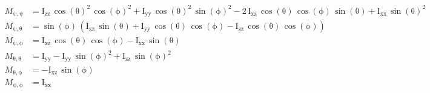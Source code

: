 \begin{align*}
  M_{\mathrm{\psi},\mathrm{\psi}}&=\mathrm{I_{zz}}\,{\cos\left(\mathrm{\theta}\right)}^2\,{\cos\left(\mathrm{\phi}\right)}^2+\mathrm{I_{yy}}\,{\cos\left(\mathrm{\theta}\right)}^2\,{\sin\left(\mathrm{\phi}\right)}^2-2\,\mathrm{I_{xz}}\,\cos\left(\mathrm{\theta}\right)\,\cos\left(\mathrm{\phi}\right)\,\sin\left(\mathrm{\theta}\right)+\mathrm{I_{xx}}\,{\sin\left(\mathrm{\theta}\right)}^2 \\
  M_{\mathrm{\psi},\mathrm{\theta}}&=\sin\left(\mathrm{\phi}\right)\,\left(\mathrm{I_{xz}}\,\sin\left(\mathrm{\theta}\right)+\mathrm{I_{yy}}\,\cos\left(\mathrm{\theta}\right)\,\cos\left(\mathrm{\phi}\right)-\mathrm{I_{zz}}\,\cos\left(\mathrm{\theta}\right)\,\cos\left(\mathrm{\phi}\right)\right) \\
  M_{\mathrm{\psi},\mathrm{\phi}}&=\mathrm{I_{xz}}\,\cos\left(\mathrm{\theta}\right)\,\cos\left(\mathrm{\phi}\right)-\mathrm{I_{xx}}\,\sin\left(\mathrm{\theta}\right) \\
  M_{\mathrm{\theta},\mathrm{\theta}}&=\mathrm{I_{yy}}-\mathrm{I_{yy}}\,{\sin\left(\mathrm{\phi}\right)}^2+\mathrm{I_{zz}}\,{\sin\left(\mathrm{\phi}\right)}^2 \\
  M_{\mathrm{\theta},\mathrm{\phi}}&=-\mathrm{I_{xz}}\,\sin\left(\mathrm{\phi}\right) \\
  M_{\mathrm{\phi},\mathrm{\phi}}&=\mathrm{I_{xx}}
\end{align*}


